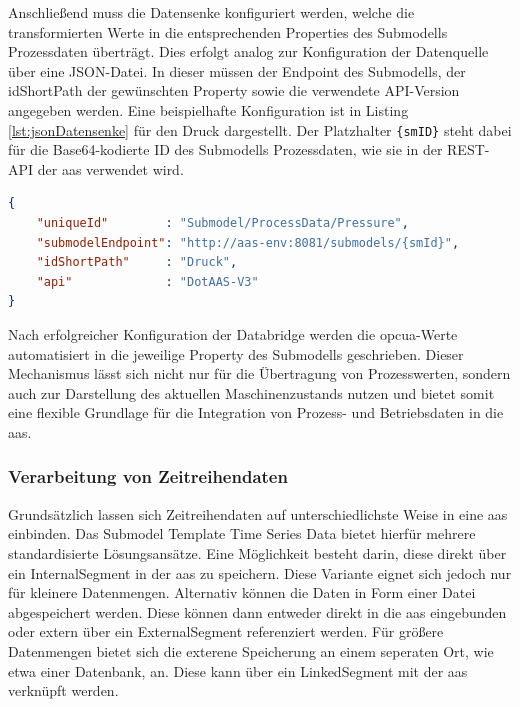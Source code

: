 Anschließend muss die Datensenke konfiguriert werden, welche die transformierten Werte in die entsprechenden Properties des Submodells Prozessdaten überträgt.
Dies erfolgt analog zur Konfiguration der Datenquelle über eine JSON-Datei.
In dieser müssen der Endpoint des Submodells, der idShortPath der gewünschten Property sowie die verwendete API-Version angegeben werden.
Eine beispielhafte Konfiguration ist in Listing \ref{lst:jsonDatensenke} für den Druck dargestellt.
Der Platzhalter \texttt{\{smID\}} steht dabei für die Base64-kodierte ID des Submodells Prozessdaten, wie sie in der REST-API der \acs{aas} verwendet wird.

\begin{lstlisting}[language=json, caption={Beispielhafte JSON-Konfiguration einer Datensenke}, label={lst:jsonDatensenke}]
{
    "uniqueId"        : "Submodel/ProcessData/Pressure",
    "submodelEndpoint": "http://aas-env:8081/submodels/{smId}",
    "idShortPath"     : "Druck",
    "api"             : "DotAAS-V3"
}
\end{lstlisting}

Nach erfolgreicher Konfiguration der Databridge werden die \acs{opcua}-Werte automatisiert in die jeweilige Property des Submodells geschrieben. 
Dieser Mechanismus lässt sich nicht nur für die Übertragung von Prozesswerten, sondern auch zur Darstellung des aktuellen Maschinenzustands nutzen und bietet somit eine flexible Grundlage für die Integration von Prozess- und Betriebsdaten in die \acs{aas}.

\subsubsection{Verarbeitung von Zeitreihendaten}

Grundsätzlich lassen sich Zeitreihendaten auf unterschiedlichste Weise in eine \acs{aas} einbinden.
Das Submodel Template Time Series Data \cite{SpezifikationTimeSeriesData} bietet hierfür mehrere standardisierte Lösungsansätze.
Eine Möglichkeit besteht darin, diese direkt über ein InternalSegment in der \acs{aas} zu speichern.
Diese Variante eignet sich jedoch nur für kleinere Datenmengen.
Alternativ können die Daten in Form einer Datei abgespeichert werden.
Diese können dann entweder direkt in die \acs{aas} eingebunden oder extern über ein ExternalSegment referenziert werden.
Für größere Datenmengen bietet sich die exterene Speicherung an einem seperaten Ort, wie etwa einer Datenbank, an.
Diese kann über ein LinkedSegment mit der \acs{aas} verknüpft werden.

